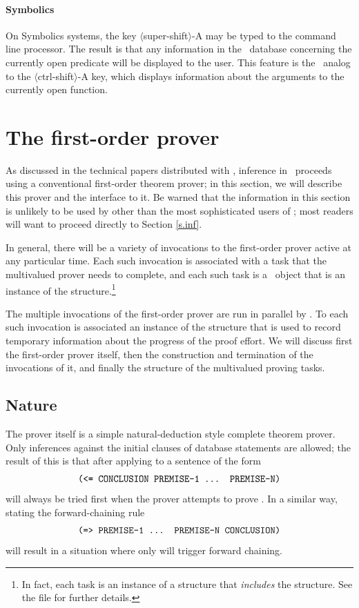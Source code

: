 \paragraph{Symbolics}
On Symbolics systems, the key $\langle$super-shift$\rangle$-A may be typed
to the command line processor.  The result is that any information in the
\mvl\ database concerning the currently open predicate will be displayed
to the user.  This feature is the \mvl\ analog to the
$\langle$ctrl-shift$\rangle$-A key, which displays information about the
arguments to the currently open function.

\section{The first-order prover}
\label{s.fo}

As discussed in the technical papers distributed with \mvl, inference
in \mvl\ proceeds using a conventional first-order theorem prover; in
this section, we will describe this prover and the interface to it.
Be warned that the information in this section is unlikely to be used
by other than the most sophisticated users of \mvl; most readers will
want to proceed directly to Section \ref{s.inf}.

In general, there will be a variety of invocations to the first-order
prover active at any particular time.  Each such invocation is
associated with a task that the multivalued prover needs to complete,
and each such task is a \lisp\ object that is an instance of the
 structure.\footnote{In fact, each task is an instance
of a structure that {\em includes\/} the  structure.
See the file  for further details.}

The multiple invocations of the first-order prover are run in
parallel by \mvl.  To each such invocation is associated an instance
of the structure  that is used to record temporary
information about the progress of the proof effort.  We will discuss
first the first-order prover itself, then the construction and
termination of the invocations of it, and finally the structure of
the multivalued proving tasks.

\subsection{Nature}
\label{s.simple}

The prover itself is a simple natural-deduction style complete
theorem prover.  Only inferences against the initial clauses of
database statements are allowed; the result of this is that after
applying  to a sentence of the form
 \[\mbox{\tt (<= CONCLUSION PREMISE-1 ... PREMISE-N)}\]
  will always be tried first when the prover attempts
to prove .  In a similar way, stating the
forward-chaining rule
 \[\mbox{\tt (=> PREMISE-1 ... PREMISE-N CONCLUSION)}\]
 will result in a situation where only  will trigger
forward chaining.

